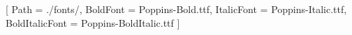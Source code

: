 \usepackage{fontspec}
\usepackage{emoji}
\setmainfont{Poppins-Regular.ttf}[
    Path = ./fonts/,
    BoldFont = Poppins-Bold.ttf,
    ItalicFont = Poppins-Italic.ttf,
    BoldItalicFont = Poppins-BoldItalic.ttf
]
